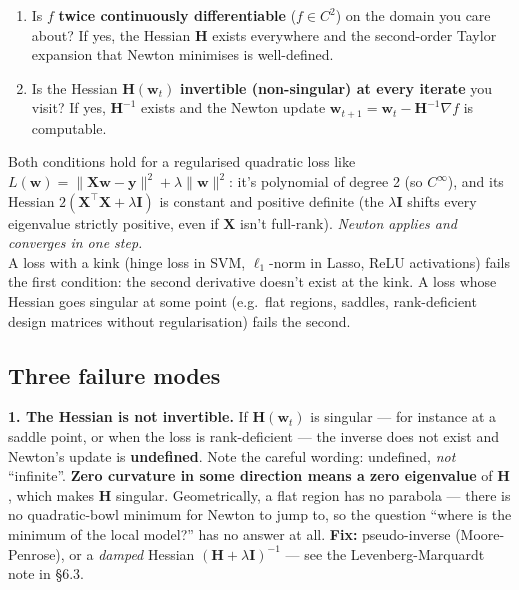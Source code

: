 \documentclass[11pt, a4paper]{article}
\begin{document}
\begin{exbox}
\begin{enumerate}[itemsep=0pt, topsep=0pt]
  \item Is $f$ \textbf{twice continuously differentiable} ($f \in C^2$) on the domain you care about? If yes, the Hessian $\mathbf{H}$ exists everywhere and the second-order Taylor expansion that Newton minimises is well-defined.
  \item Is the Hessian $\mathbf{H}(\mathbf{w}_t)$ \textbf{invertible (non-singular) at every iterate} you visit? If yes, $\mathbf{H}^{-1}$ exists and the Newton update $\mathbf{w}_{t+1} = \mathbf{w}_t - \mathbf{H}^{-1}\nabla f$ is computable.
\end{enumerate}
Both conditions hold for a regularised quadratic loss like $L(\mathbf{w}) = \|\mathbf{X}\mathbf{w}-\mathbf{y}\|^2 + \lambda\|\mathbf{w}\|^2$: it's polynomial of degree 2 (so $C^\infty$), and its Hessian $2(\mathbf{X}^\top\mathbf{X} + \lambda\mathbf{I})$ is constant and positive definite (the $\lambda\mathbf{I}$ shifts every eigenvalue strictly positive, even if $\mathbf{X}$ isn't full-rank). \emph{Newton applies and converges in one step.}\\[0.3em]
A loss with a kink (hinge loss in SVM, $\ell_1$-norm in Lasso, ReLU activations) fails the first condition: the second derivative doesn't exist at the kink. A loss whose Hessian goes singular at some point (e.g.\ flat regions, saddles, rank-deficient design matrices without regularisation) fails the second.
\end{exbox}

\subsection{Three failure modes}

\textbf{1. The Hessian is not invertible.} If $\mathbf{H}(\mathbf{w}_t)$ is singular — for instance at a saddle point, or when the loss is rank-deficient — the inverse does not exist and Newton's update is \textbf{undefined}. Note the careful wording: undefined, \emph{not} ``infinite''. \textbf{Zero curvature in some direction means a zero eigenvalue} of $\mathbf{H}$, which makes $\mathbf{H}$ singular. Geometrically, a flat region has no parabola — there is no quadratic-bowl minimum for Newton to jump to, so the question ``where is the minimum of the local model?'' has no answer at all. \textbf{Fix:} pseudo-inverse (Moore-Penrose), or a \emph{damped} Hessian $(\mathbf{H} + \lambda\mathbf{I})^{-1}$ — see the Levenberg-Marquardt note in §6.3.
\end{document}
